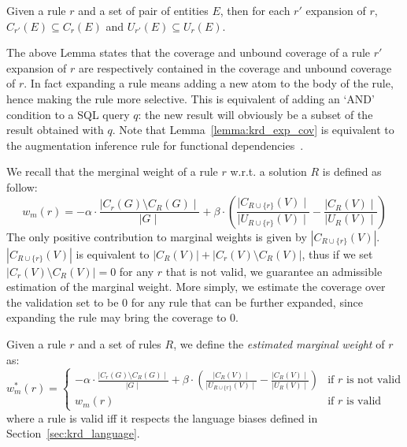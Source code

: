 \begin{lemma} \label{lemma:krd_exp_cov}
	Given a rule $r$ and a set of pair of entities $E$, then for each $r'$ expansion of $r$, $C_{r'}(E) \subseteq C_r(E)$ and $U_{r'}(E) \subseteq U_r(E)$.
\end{lemma}
The above Lemma states that the coverage and unbound coverage of a rule $r'$ expansion of $r$ are respectively contained in the coverage and unbound coverage of $r$. In fact expanding a rule means adding a new atom to the body of the rule, hence making the rule more selective. This is equivalent of adding an `AND' condition to a SQL query $q$: the new result will obviously be a subset of the result obtained with $q$.
Note that Lemma~\ref{lemma:krd_exp_cov} is equivalent to the augmentation inference rule for functional dependencies~\cite{abiteboul1995foundations}.

We recall that the merginal weight of a rule $r$ w.r.t. a solution $R$ is defined as follow:
\begin{equation*}
w_m(r) = - \alpha \cdot \frac{\mid C_{r}(G) \setminus C_{R}(G) \mid}{\mid G \mid} + \beta \cdot (\frac{\mid C_{R \cup \{r\}}(V) \mid}{\mid U_{R \cup \{r\}}(V) \mid} - \frac{\mid C_{R}(V) \mid}{\mid U_{R}(V) \mid})
\end{equation*}
The only positive contribution to marginal weights is given by $|C_{R \cup \{r\}}(V)|$. $|C_{R \cup \{r\}}(V)|$ is equivalent to $|C_{R}(V)| + |C_r(V) \setminus C_R(V)|$, thus if we set $|C_r(V) \setminus C_R(V)|=0$ for any $r$ that is not valid, we guarantee an admissible estimation of the marginal weight. More simply, we estimate the coverage over the validation set to be $0$ for any rule that can be further expanded, since expanding the rule may bring the coverage to $0$.

\begin{definition}\label{def:est_res_wei}
	Given a rule $r$ and a set of rules $R$, we define the \emph{estimated marginal weight} of $r$ as:
	\begin{equation*}
	w_m^*(r) = 
	\begin{cases} - \alpha \cdot \frac{\mid C_{r}(G) \setminus C_{R}(G) \mid}{\mid G \mid} + \beta \cdot (\frac{\mid C_R(V) \mid}{\mid U_{R \cup \{r\}}(V) \mid} - \frac{\mid C_{R}(V) \mid}{\mid U_{R}(V) \mid}) & \mbox{if } r\mbox{ is not valid} \\ w_m(r) & \mbox{if } r\mbox{ is valid} \end{cases}
	\end{equation*}
	where a rule is valid iff it respects the language biases defined in Section~\ref{sec:krd_language}.
\end{definition}

